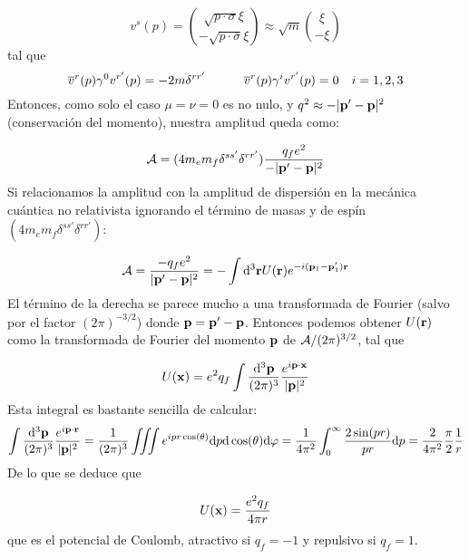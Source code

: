 \begin{solucion}
	
	\begin{equation*}
		v^s(p) = \binom{\sqrt{p \cdot \sigma} \xi }{-\sqrt{p \cdot \overline{\sigma}} \xi } \approx \sqrt{m} \binom{\xi}{-\xi}
	\end{equation*}
	tal que 
	\begin{equation*}
		\overline{v}^{r}(p) \gamma^0 v^{r'}(p) = -2m \delta^{rr'}  \quad \quad \quad
		\overline{v}^{r}(p) \gamma^i v^{r'}(p) = 0 \quad i=1,2,3
	\end{equation*}
	Entonces, como solo el caso $\mu=\nu=0$ es no nulo, y $q^2 \approx -|\mathbf{p}'-\mathbf{p}|^2$ (conservación del momento), nuestra amplitud queda como:
	
	\begin{equation*}
		\mathcal{A} =  ( 4 m_e m_f \delta^{ss'}\delta^{rr'} ) \frac{q_f e^2}{-|\mathbf{p}'-\mathbf{p}|^2}
	\end{equation*}
	Si relacionamos la amplitud con la amplitud de dispersión en la mecánica cuántica no relativista ignorando el término de masas y de espín $( 4 m_e m_f \delta^{ss'}\delta^{rr'} )$:
	
	\begin{equation*}
		\mathcal{A} = \frac{-q_f e^2}{|\mathbf{p}'-\mathbf{p}|^2} = - \int \mathrm{d}^3 \mathbf{r} U(\mathbf{r}) e^{-i(\mathbf{p}_1-\mathbf{p}_1')\mathbf{r}}
	\end{equation*}
	El término de la derecha se parece mucho a una transformada de Fourier (salvo por el factor $(2\pi)^{-3/2}$) donde $\mathbf{p}=\mathbf{p}'-\mathbf{p}$. Entonces podemos obtener $U(\mathbf{r})$ como la transformada de Fourier del momento $\mathbf{p}$ de $\mathcal{A}/(2\pi)^{3/2}$, tal que 
	
	\begin{equation*}
		U(\mathbf{x}) = e^2 q_f \int \frac{\mathrm{d}^3 \mathbf{p}}{(2\pi)^3} \frac{e^{i\mathbf{p} \cdot \mathbf{x}}}{|\mathbf{p}|^2}
	\end{equation*}
	Esta integral es bastante sencilla de calcular:
	\begin{equation*}
		\int \frac{\mathrm{d}^3 \mathbf{p}}{(2\pi)^3} \frac{e^{i\mathbf{p} \cdot \mathbf{r}}}{|\mathbf{p}|^2} = \frac{1}{(2\pi)^3} \iiint e^{i p r \cos (\theta)} \mathrm{d} p \mathrm{d} \cos(\theta) \mathrm{d} \varphi = \frac{1}{4\pi^2} \int_0^\infty \frac{2\sin(pr)}{pr}  \mathrm{d} p = \frac{2}{4\pi^2} \frac{\pi}{2} \frac{1}{r}
	\end{equation*}
	De lo que se deduce que
	
	\begin{equation*}
		U(\mathbf{x}) = \frac{e^2 q_f}{4\pi r}
	\end{equation*}
	que es el potencial de Coulomb, atractivo si $q_f=-1$ y repulsivo si $q_f=1$.
\end{solucion}

